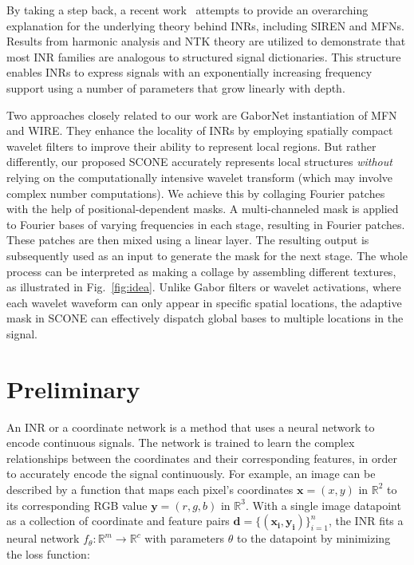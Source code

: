 \documentclass[letterpaper]{article} %
\begin{document}
By taking a step back, a recent work~\cite{yuce2022structured} attempts to provide an overarching explanation for the underlying theory behind INRs, including SIREN and MFNs. Results from harmonic analysis and NTK theory are utilized to demonstrate that most INR families are analogous to structured signal dictionaries. This structure enables INRs to express signals with an exponentially increasing frequency support using a number of parameters that grow linearly with depth.

Two approaches closely related to our work are GaborNet instantiation of MFN and WIRE. They enhance the locality of INRs by employing spatially compact wavelet filters to improve their ability to represent local regions. But rather differently, our proposed SCONE accurately represents local structures \textit{without} relying on the computationally intensive wavelet transform (which may involve complex number computations). We achieve this by collaging Fourier patches with the help of positional-dependent masks. A multi-channeled mask is applied to Fourier bases of varying frequencies in each stage, resulting in Fourier patches. These patches are then mixed using a linear layer. The resulting output is subsequently used as an input to generate the mask for the next stage. The whole process can be interpreted as making a collage by assembling different textures, as illustrated in Fig.~\ref{fig:idea}. Unlike Gabor filters or wavelet activations, where each wavelet waveform can only appear in specific spatial locations, the adaptive mask in SCONE can effectively dispatch global bases to multiple locations in the signal.

\section{Preliminary}
\label{sec:method_inr}
An INR or a coordinate network is a method that uses a neural network to encode continuous signals. The network is trained to learn the complex relationships between the coordinates and their corresponding features, in order to accurately encode the signal continuously. For example, an image can be described by a function that maps each pixel's coordinates $\mathbf{x} = (x, y)$ in $\mathbb{R}^2$ to its corresponding RGB value $\mathbf{y} = (r, g, b)$ in $\mathbb{R}^3$. With a single image datapoint as a collection of coordinate and feature pairs $\mathbf{d} = \{(\mathbf{x_i}, \mathbf{y_i})\}_{i=1}^n$, the INR fits a neural network $f_\theta : \mathbb{R}^m \rightarrow \mathbb{R}^c$ with parameters $\theta$ to the datapoint by minimizing the loss function:
\end{document}
